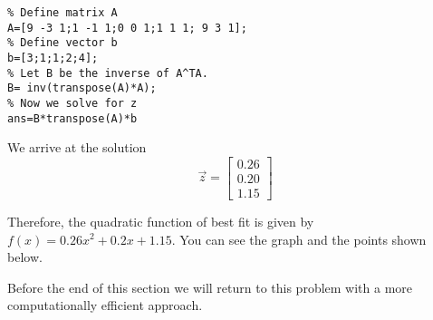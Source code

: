 \documentclass{ximera}
\begin{document}
\begin{example}
\begin{explanation}
\begin{verbatim}
% Define matrix A
A=[9 -3 1;1 -1 1;0 0 1;1 1 1; 9 3 1];
% Define vector b
b=[3;1;1;2;4];
% Let B be the inverse of A^TA.  
B= inv(transpose(A)*A);
% Now we solve for z
ans=B*transpose(A)*b
\end{verbatim}
    
    We arrive at the solution
    $$\vec{z}=\begin{bmatrix}0.26\\0.20\\1.15\end{bmatrix}$$

    Therefore, the quadratic function of best fit is given by $f(x)=0.26x^2+0.2x+1.15$.  You can see the graph and the points shown below.

\begin{onlineOnly}
\begin{center}
\end{center}
\end{onlineOnly}

Before the end of this section we will return to this problem with a more computationally efficient approach.
\end{explanation}
 \end{example}
\end{document}
